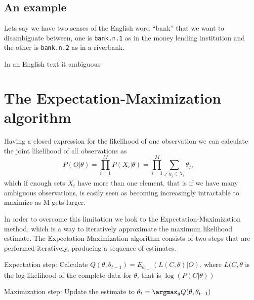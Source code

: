 \subsection{An example}

Lets say we have two senses of the English word ``bank'' that we want to disambiguate between, one is \texttt{bank.n.1} as in the money lending institution and the other is \texttt{bank.n.2} as in a riverbank. 

In an English text it ambiguous


\section{The Expectation-Maximization algorithm}
Having a closed expression for the likelihood of one observation we can calculate the joint likelihood of all observations as 
\begin{equation*}
P(O | \theta) = \prod_{i=1}^M P(X_i | \theta) = \prod_{i=1}^M \sum_{j: y_j\in X_i}\theta_j,
\end{equation*}
which if enough sets $X_i$ have more than one element, that is if we have many ambiguous observations, is easily seen as becoming increasingly intractable to maximize as M gets larger.

In order to overcome this limitation we look to the Expectation-Maximization method, which is a way to iteratively approximate the maximum likelihood estimate. The Expectation-Maximization algorithm consists of two steps that are performed iteratively, producing a sequence of estimates. 

Expectation step: Calculate $Q(\theta,\theta_{t-1})=E_{\theta_{t-1}}\left ( L(C,\theta) | O \right )$, where $L(C,\theta$ is the log-likelihood of the complete data for $\theta$, that is $\log (P(C|\theta))$

Maximization step: Update the estimate to $\theta_t = \argmax_\theta Q(\theta, \theta_{t-1})$

